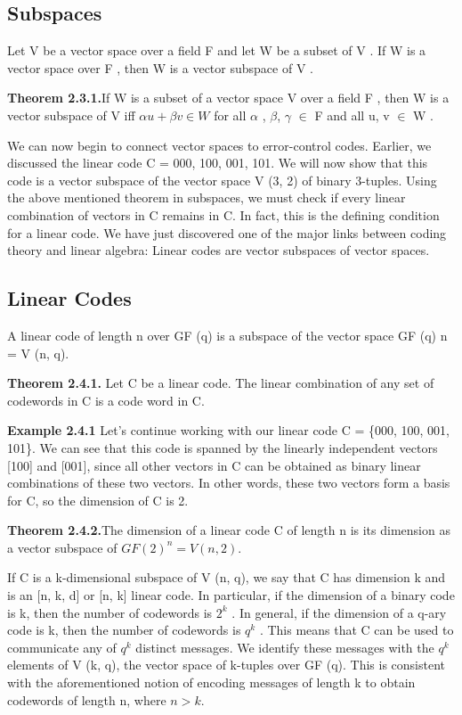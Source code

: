 \documentclass{article}
\begin{document}
\subsection{Subspaces}
Let V be a vector space over a field F and let W be a subset of V . If W is a
vector space over F , then W is a vector subspace of V .

\textbf{Theorem 2.3.1.}If W is a subset of a vector space V over a field F , then W is a vector subspace
of V iff $\alpha u + \beta v \in W$ for all $\alpha$ , $\beta$, $\gamma$ $\in$ F and all u, v $\in$ W .

We can now begin to connect vector spaces to error-control codes. Earlier, we discussed
the linear code C = {000, 100, 001, 101}. We will now show that this code is a vector subspace of
the vector space V (3, 2) of binary 3-tuples. Using the above mentioned theorem in subspaces, we must check if every linear
combination of vectors in C remains in C. In fact, this is the defining
condition for a linear code. We have just discovered one of the major links between coding theory
and linear algebra: Linear codes are vector subspaces of vector spaces.

\subsection{Linear Codes}
A linear code of length n over GF (q) is a subspace of the vector space GF (q) n = V (n, q).

\textbf{Theorem 2.4.1.} Let C be a linear code. The linear combination of any set of codewords in C is a code word in C.

\textbf{Example 2.4.1} Let’s continue working with our linear code C = \{000, 100, 001, 101\}. We can see
that this code is spanned by the linearly independent vectors [100] and [001], since all other vectors
in C can be obtained as binary linear combinations of these two vectors. In other words, these two
vectors form a basis for C, so the dimension of C is 2.

\textbf{Theorem 2.4.2.}The dimension of a linear code C of length n is its dimension as a vector
subspace of $GF (2)^n = V (n, 2)$.

If C is a k-dimensional subspace of V (n, q), we say that C has dimension k and is an [n, k, d] or
[n, k] linear code. In particular, if the dimension of a binary code is k, then the number of codewords is $2^k$ . In general, if the
dimension of a q-ary code is k, then the number of codewords is $q^k$ . This means that C can be used
to communicate any of $q^k$ distinct messages. We identify these messages with the $q^k$ elements of
V (k, q), the vector space of k-tuples over GF (q). This is consistent with the aforementioned notion
of encoding messages of length k to obtain codewords of length n, where $n > k$.
\end{document}
